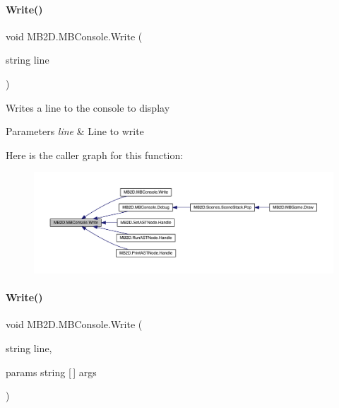 \paragraph{\texorpdfstring{Write()}{Write()}\hspace{0.1cm}{\footnotesize\ttfamily [1/3]}}
{\footnotesize\ttfamily void M\+B2\+D.\+M\+B\+Console.\+Write (\begin{DoxyParamCaption}\item[{string}]{line }\end{DoxyParamCaption})\hspace{0.3cm}{\ttfamily [inline]}}



Writes a line to the console to display 


\begin{DoxyParams}{Parameters}
{\em line} & Line to write\\
\hline
\end{DoxyParams}
Here is the caller graph for this function\+:
\nopagebreak
\begin{figure}[H]
\begin{center}
\leavevmode
\includegraphics[width=350pt]{class_m_b2_d_1_1_m_b_console_a1d85081cb5400f09883c1fc62f37d861_icgraph}
\end{center}
\end{figure}
\hypertarget{class_m_b2_d_1_1_m_b_console_a77bc48284eeebbc13eeced6451513c09}{}\label{class_m_b2_d_1_1_m_b_console_a77bc48284eeebbc13eeced6451513c09} 
\paragraph{\texorpdfstring{Write()}{Write()}\hspace{0.1cm}{\footnotesize\ttfamily [2/3]}}
{\footnotesize\ttfamily void M\+B2\+D.\+M\+B\+Console.\+Write (\begin{DoxyParamCaption}\item[{string}]{line,  }\item[{params string \mbox{[}$\,$\mbox{]}}]{args }\end{DoxyParamCaption})\hspace{0.3cm}{\ttfamily [inline]}}



